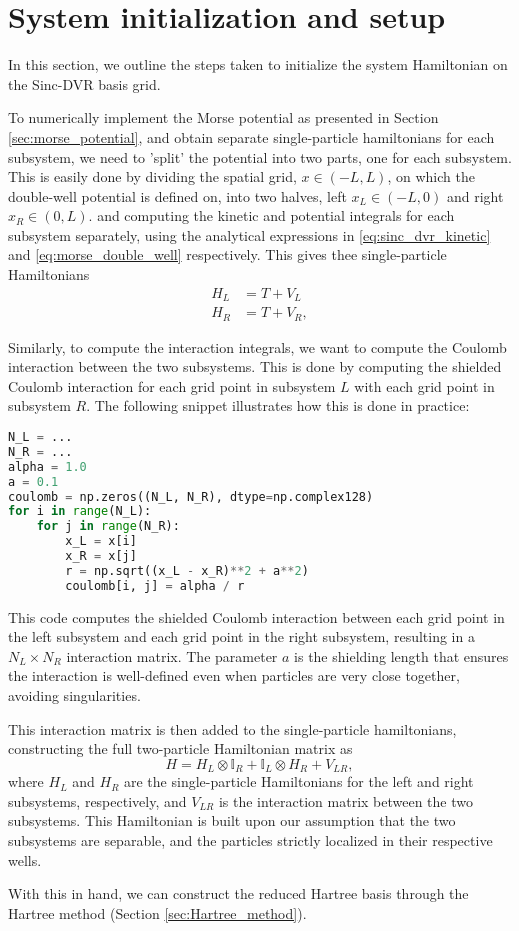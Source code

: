 \documentclass{subfiles}
\begin{document}
\section{System initialization and setup}\label{sec:system_init}
In this section, we outline the steps taken to initialize the system Hamiltonian on the Sinc-DVR basis grid.

To numerically implement the Morse potential as presented in Section \ref{sec:morse_potential}, and obtain separate single-particle hamiltonians for each subsystem, we need to 'split' the potential into two parts, one for each subsystem. This is easily done by dividing the spatial grid, $x\in(-L, L)$, on which the double-well potential is defined on, into two halves, left $x_L\in(-L, 0)$ and right $x_R\in(0, L)$. and computing the kinetic and potential integrals for each subsystem separately, using the analytical expressions in \eqref{eq:sinc_dvr_kinetic} and \eqref{eq:morse_double_well} respectively. This gives thee single-particle Hamiltonians 
\begin{align*}
    H_L &= T + V_L \\
    H_R &= T + V_R,
\end{align*}

Similarly, to compute the interaction integrals, we want to compute the Coulomb interaction between the two subsystems. This is done by computing the shielded Coulomb interaction for each grid point in subsystem $L$ with each grid point in subsystem $R$. The following snippet illustrates how this is done in practice:
\begin{lstlisting}[language=Python]
N_L = ...
N_R = ...
alpha = 1.0
a = 0.1
coulomb = np.zeros((N_L, N_R), dtype=np.complex128)
for i in range(N_L):
    for j in range(N_R):
        x_L = x[i]
        x_R = x[j]
        r = np.sqrt((x_L - x_R)**2 + a**2)
        coulomb[i, j] = alpha / r
\end{lstlisting}
This code computes the shielded Coulomb interaction between each grid point in the left subsystem and each grid point in the right subsystem, resulting in a $N_L \times N_R$ interaction matrix. The parameter $a$ is the shielding length that ensures the interaction is well-defined even when particles are very close together, avoiding singularities.

This interaction matrix is then added to the single-particle hamiltonians, constructing the full two-particle Hamiltonian matrix as
\begin{equation}
    H = H_L \otimes \mathbb{I}_R + \mathbb{I}_L \otimes H_R + V_{LR},\label{eq:two_particle_hamiltonian}
\end{equation}
where $H_L$ and $H_R$ are the single-particle Hamiltonians for the left and right subsystems, respectively, and $V_{LR}$ is the interaction matrix between the two subsystems. This Hamiltonian is built upon our assumption that the two subsystems are separable, and the particles strictly localized in their respective wells.

With this in hand, we can construct the reduced Hartree basis through the Hartree method (Section \ref{sec:Hartree_method}).
\end{document}

